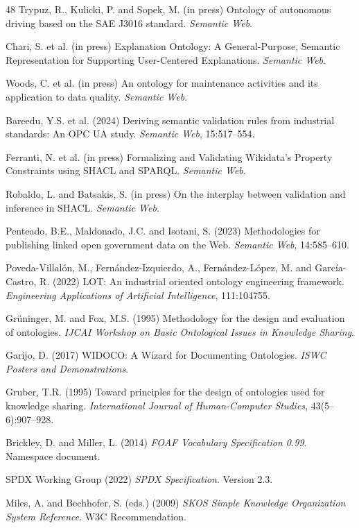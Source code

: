 \documentclass[11pt,a4paper]{article}
\begin{document}
\begin{thebibliography}{48}
 Trypuz, R., Kulicki, P. and Sopek, M. (in press) Ontology of autonomous driving based on the SAE J3016 standard. \emph{Semantic Web}.

 Chari, S. et al. (in press) Explanation Ontology: A General-Purpose, Semantic Representation for Supporting User-Centered Explanations. \emph{Semantic Web}.

 Woods, C. et al. (in press) An ontology for maintenance activities and its application to data quality. \emph{Semantic Web}.

 Bareedu, Y.S. et al. (2024) Deriving semantic validation rules from industrial standards: An OPC UA study. \emph{Semantic Web}, 15:517--554.

 Ferranti, N. et al. (in press) Formalizing and Validating Wikidata's Property Constraints using SHACL and SPARQL. \emph{Semantic Web}.

 Robaldo, L. and Batsakis, S. (in press) On the interplay between validation and inference in SHACL. \emph{Semantic Web}.

 Penteado, B.E., Maldonado, J.C. and Isotani, S. (2023) Methodologies for publishing linked open government data on the Web. \emph{Semantic Web}, 14:585--610.

 Poveda-Villalón, M., Fernández-Izquierdo, A., Fernández-López, M. and García-Castro, R. (2022) LOT: An industrial oriented ontology engineering framework. \emph{Engineering Applications of Artificial Intelligence}, 111:104755.

 Gr\"uninger, M. and Fox, M.S. (1995) Methodology for the design and evaluation of ontologies. \emph{IJCAI Workshop on Basic Ontological Issues in Knowledge Sharing}.

 Garijo, D. (2017) WIDOCO: A Wizard for Documenting Ontologies. \emph{ISWC Posters and Demonstrations}.

 Gruber, T.R. (1995) Toward principles for the design of ontologies used for knowledge sharing. \emph{International Journal of Human-Computer Studies}, 43(5--6):907--928.

 Brickley, D. and Miller, L. (2014) \emph{FOAF Vocabulary Specification 0.99}. Namespace document.

 SPDX Working Group (2022) \emph{SPDX Specification}. Version 2.3.

 Miles, A. and Bechhofer, S. (eds.) (2009) \emph{SKOS Simple Knowledge Organization System Reference}. W3C Recommendation.


\end{thebibliography}
\end{document}
